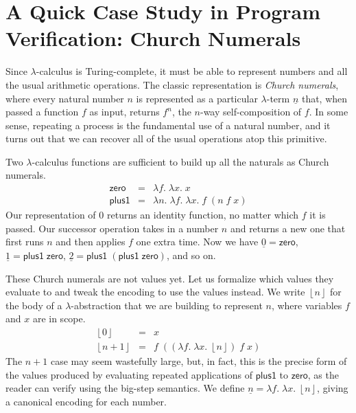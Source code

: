 \documentclass{amsbook}
\theoremstyle{definition}
\theoremstyle{remark}
\numberwithin{section}{chapter}
\numberwithin{equation}{chapter}
\begin{document}
\section{A Quick Case Study in Program Verification: Church Numerals}\label{churchenc}

\newcommand{\church}[1]{\underline{#1}}

Since $\lambda$-calculus is Turing-complete, it must be able to represent numbers and all the usual arithmetic operations.
The classic representation is \emph{Church numerals}, where every natural number $n$ is represented as a particular $\lambda$-term $\church{n}$ that, when passed a function $f$ as input, returns $f^n$, the $n$-way self-composition of $f$.
In some sense, repeating a process is the fundamental use of a natural number, and it turns out that we can recover all of the usual operations atop this primitive.

\newcommand{\lc}[1]{\mathsf{#1}}

Two $\lambda$-calculus functions are sufficient to build up all the naturals as Church numerals.
\begin{eqnarray*}
  \lc{zero} &=& \lambda f. \; \lambda x. \; x \\
  \lc{plus1} &=& \lambda n. \; \lambda f. \; \lambda x. \; f \; (n \; f \; x)
\end{eqnarray*}
Our representation of 0 returns an identity function, no matter which $f$ it is passed.
Our successor operation takes in a number $n$ and returns a new one that first runs $n$ and then applies $f$ one extra time.
Now we have $\church{0} = \lc{zero}$, $\church{1} = \lc{plus1} \; \lc{zero}$, $\church{2} = \lc{plus1} \; (\lc{plus1} \; \lc{zero})$, and so on.

\newcommand{\prechurch}[1]{\left \lfloor #1 \right \rfloor}

These Church numerals are not values yet.
Let us formalize which values they evaluate to and tweak the encoding to use the values instead.
We write $\prechurch{n}$ for the body of a $\lambda$-abstraction that we are building to represent $n$, where variables $f$ and $x$ are in scope.
\begin{eqnarray*}
  \prechurch{0} &=& x \\
  \prechurch{n+1} &=& f \; ((\lambda f. \; \lambda x. \; \prechurch{n}) \; f \; x)
\end{eqnarray*}
The $n+1$ case may seem wastefully large, but, in fact, this is the precise form of the values produced by evaluating repeated applications of $\lc{plus1}$ to $\lc{zero}$, as the reader can verify using the big-step semantics.
We define $\church{n} = \lambda f. \; \lambda x. \; \prechurch{n}$, giving a canonical encoding for each number.
\end{document}
